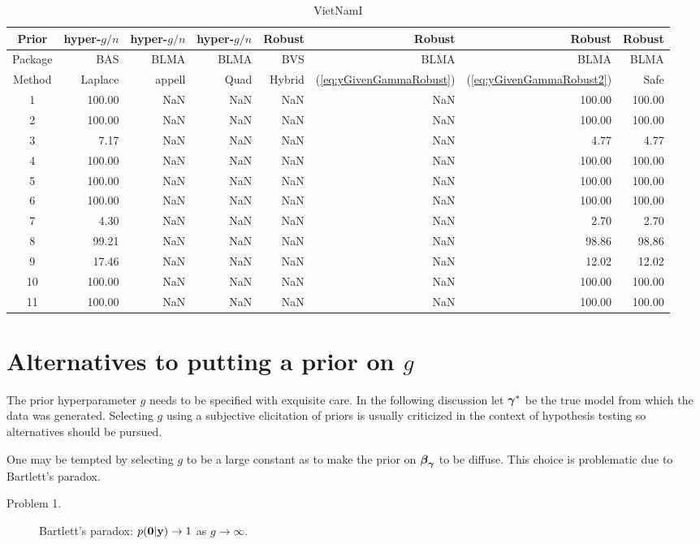 \begin{table}[ht]
	\centering
	\centering
	\begin{tabular}{c|rrr|rrrr}
		Prior   & hyper-$g/n$ & hyper-$g/n$ & hyper-$g/n$ & Robust &  Robust & Robust & Robust \\		
		\hline
		Package & BAS         & BLMA        & BLMA        & BVS & BLMA & BLMA & BLMA  \\
		\hline 
		Method  & Laplace     & appell      & Quad  & Hybrid & (\ref{eq:yGivenGammaRobust}) & (\ref{eq:yGivenGammaRobust2}) & Safe \\ 
		\hline
		1 & 100.00 & NaN & NaN & NaN & NaN & 100.00 & 100.00 \\ 
		2 & 100.00 & NaN & NaN & NaN & NaN & 100.00 & 100.00 \\ 
		3 & 7.17 & NaN & NaN & NaN & NaN & 4.77 & 4.77 \\ 
		4 & 100.00 & NaN & NaN & NaN & NaN & 100.00 & 100.00 \\ 
		5 & 100.00 & NaN & NaN & NaN & NaN & 100.00 & 100.00 \\ 
		6 & 100.00 & NaN & NaN & NaN  & NaN  & 100.00 & 100.00 \\ 
		7 & 4.30 & NaN & NaN &NaN  & NaN & 2.70 & 2.70 \\ 
		8 & 99.21 & NaN & NaN & NaN & NaN  & 98.86 & 98.86 \\ 
		9 & 17.46 & NaN & NaN & NaN & NaN & 12.02 & 12.02 \\ 
		10 & 100.00 & NaN & NaN & NaN & NaN & 100.00 & 100.00 \\ 
		11 & 100.00 & NaN & NaN & NaN & NaN & 100.00 & 100.00 \\ 
		\hline
	\end{tabular}
	\caption{VietNamI}
	\label{tab:VietNamIResults2}
\end{table}

\section{Alternatives to putting a prior on $g$}
\label{sec:MarginalLikelihood}

The prior hyperparameter $g$ needs to be specified with exquisite care. 
In the following discussion let ${\boldsymbol \gamma}^*$ be the true model from which the data was generated. 
Selecting $g$ using a subjective elicitation of priors is usually criticized in the context of 
hypothesis testing so alternatives should be pursued. 

One may be tempted by selecting $g$ to be a large constant as to make the prior on
${\boldsymbol \beta}_{\boldsymbol \gamma}$ to be diffuse. This choice is problematic due to Bartlett's paradox. 
\begin{description}
	\item[Problem 1.] Bartlett's paradox: $p({\bf 0}|{\bf y}) \to 1$ as $g\to\infty$.
\end{description}

